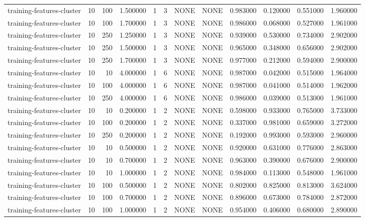 \begin{tabular}{lrrrllllrrrr}
training-features-cluster & 10 & 100 & 1.500000 & 1 & 3 & NONE & NONE & 0.983000 & 0.120000 & 0.551000 & 1.960000 \\
training-features-cluster & 10 & 100 & 1.700000 & 1 & 3 & NONE & NONE & 0.986000 & 0.068000 & 0.527000 & 1.961000 \\
training-features-cluster & 10 & 250 & 1.250000 & 1 & 3 & NONE & NONE & 0.939000 & 0.530000 & 0.734000 & 2.902000 \\
training-features-cluster & 10 & 250 & 1.500000 & 1 & 3 & NONE & NONE & 0.965000 & 0.348000 & 0.656000 & 2.902000 \\
training-features-cluster & 10 & 250 & 1.700000 & 1 & 3 & NONE & NONE & 0.977000 & 0.212000 & 0.594000 & 2.900000 \\
training-features-cluster & 10 & 10 & 4.000000 & 1 & 6 & NONE & NONE & 0.987000 & 0.042000 & 0.515000 & 1.964000 \\
training-features-cluster & 10 & 100 & 4.000000 & 1 & 6 & NONE & NONE & 0.987000 & 0.041000 & 0.514000 & 1.962000 \\
training-features-cluster & 10 & 250 & 4.000000 & 1 & 6 & NONE & NONE & 0.986000 & 0.039000 & 0.513000 & 1.961000 \\
training-features-cluster & 10 & 10 & 0.200000 & 1 & 2 & NONE & NONE & 0.598000 & 0.933000 & 0.765000 & 3.733000 \\
training-features-cluster & 10 & 100 & 0.200000 & 1 & 2 & NONE & NONE & 0.337000 & 0.981000 & 0.659000 & 3.272000 \\
training-features-cluster & 10 & 250 & 0.200000 & 1 & 2 & NONE & NONE & 0.192000 & 0.993000 & 0.593000 & 2.960000 \\
training-features-cluster & 10 & 10 & 0.500000 & 1 & 2 & NONE & NONE & 0.920000 & 0.631000 & 0.776000 & 2.863000 \\
training-features-cluster & 10 & 10 & 0.700000 & 1 & 2 & NONE & NONE & 0.963000 & 0.390000 & 0.676000 & 2.900000 \\
training-features-cluster & 10 & 10 & 1.000000 & 1 & 2 & NONE & NONE & 0.984000 & 0.113000 & 0.548000 & 1.961000 \\
training-features-cluster & 10 & 100 & 0.500000 & 1 & 2 & NONE & NONE & 0.802000 & 0.825000 & 0.813000 & 3.624000 \\
training-features-cluster & 10 & 100 & 0.700000 & 1 & 2 & NONE & NONE & 0.896000 & 0.673000 & 0.784000 & 2.872000 \\
training-features-cluster & 10 & 100 & 1.000000 & 1 & 2 & NONE & NONE & 0.954000 & 0.406000 & 0.680000 & 2.890000 \\

\end{tabular}
